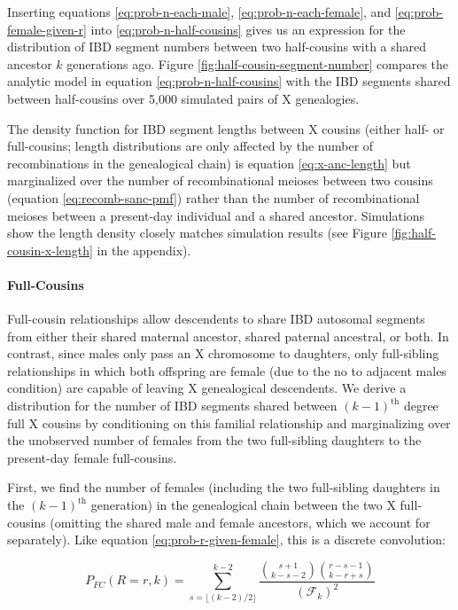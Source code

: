 \documentclass[9pt,twocolumn,twoside]{gsajnl}
\begin{document}
Inserting equations \eqref{eq:prob-n-each-male}, \eqref{eq:prob-n-each-female},
and \eqref{eq:prob-female-given-r} into \eqref{eq:prob-n-half-cousins} gives us
an expression for the distribution of IBD segment numbers between two
half-cousins with a shared ancestor $k$ generations ago. Figure
\ref{fig:half-cousin-segment-number} compares the analytic model in equation
\eqref{eq:prob-n-half-cousins} with the IBD segments shared between
half-cousins over 5,000 simulated pairs of X genealogies.

The density function for IBD segment lengths between X cousins (either half- or
full-cousins; length distributions are only affected by the number of
recombinations in the genealogical chain) is equation \eqref{eq:x-anc-length}
but marginalized over the number of recombinational meioses between two cousins
(equation \eqref{eq:recomb-sanc-pmf}) rather than the number of recombinational
meioses between a present-day individual and a shared ancestor. Simulations
show the length density closely matches simulation results (see Figure
\ref{fig:half-cousin-x-length} in the appendix).

\paragraph{Full-Cousins}
\label{sec:full-cousins}

Full-cousin relationships allow descendents to share IBD autosomal segments
from either their shared maternal ancestor, shared paternal ancestral, or both.
In contrast, since males only pass an X chromosome to daughters, only
full-sibling relationships in which both offspring are female (due to the no to
adjacent males condition) are capable of leaving X genealogical descendents. We
derive a distribution for the number of IBD segments shared between
$(k-1)^\text{th}$ degree full X cousins by conditioning on this familial
relationship and marginalizing over the unobserved number of females from the
two full-sibling daughters to the present-day female full-cousins.

First, we find the number of females (including the two full-sibling daughters
in the $(k-1)^\text{th}$ generation) in the genealogical chain between the two
X full-cousins (omitting the shared male and female ancestors, which we account
for separately). Like equation \eqref{eq:prob-r-given-female}, this is a
discrete convolution:

\begin{equation}
  P_{FC}(R = r, k) = \sum_{s = \lfloor (k-2)/2 \rfloor}^{k-2} \frac{{s+1 \choose k-s-2 } {r-s-1 \choose k-r+s}}{(\mathcal{F}_k)^2}
\end{equation}
\end{document}
